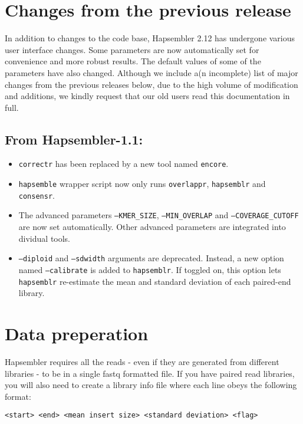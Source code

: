 \documentclass[12pt,a4paper]{report}
\newcommand{\hapversion}{2.12}
\begin{document}
\section{Changes from the previous release}

In addition to changes to the code base, Hapsembler \hapversion{} has undergone various user interface changes. Some parameters are now automatically set for convenience and more robust results. The default values of some of the parameters have also changed. Although we include a(n incomplete) list of major changes from the previous releases below, due to the high volume of modification and additions, we kindly request that our old users read this documentation in full.

\subsection{From Hapsembler-1.1:}

\begin{itemize}
\item \texttt{correctr} has been replaced by a new tool named \texttt{encore}.
\item \texttt{hapsemble} wrapper script now only runs \texttt{overlappr}, \texttt{hapsemblr} and \texttt{consensr}.
\item The advanced parameters \texttt{--KMER\_SIZE}, \texttt{--MIN\_OVERLAP} and \texttt{--COVERAGE\_CUTOFF} are now set automatically. Other advanced parameters are integrated into dividual tools.
\item \texttt{--diploid} and \texttt{--sdwidth} arguments are deprecated. Instead, a new option named \texttt{--calibrate} is added to \texttt{hapsemblr}. If toggled on, this option lets \texttt{hapsemblr} re-estimate the mean and standard deviation of each paired-end library.
\end{itemize}

\section{Data preperation}
\label{data}

Hapsembler requires all the reads - even if they are generated from different libraries - to be in a single fastq formatted file. If you have paired read libraries, you will also need to create a library info file where each line obeys the following format:

\begin{verbatim}
<start> <end> <mean insert size> <standard deviation> <flag>
\end{verbatim}
\end{document}
